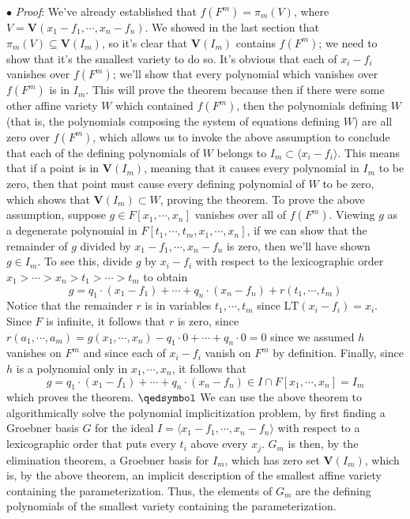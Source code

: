 \documentclass{article}
\begin{document}
\indent $ \bullet $ \textit{Proof}: We've already established that $ f(F^m) = \pi_m(V) $, where $ V = \mathbf{V}(x_1 - f_1, \cdots, x_n - f_n) $. We showed in the last section that $ \pi_m(V) \subseteq \mathbf{V}(I_m) $, so it's clear that $ \mathbf{V}(I_m) $ contains $ f(F^m) $; we need to show that it's the smallest variety to do so. It's obvious that each of $ x_i - f_i $ vanishes over $ f(F^m) $; we'll show that every polynomial which vanishes over $ f(F^m) $ is in $ I_m $. This will prove the theorem because then if there were some other affine variety $ W $ which contained $ f(F^m) $, then the polynomials defining $ W $ (that is, the polynomials composing the system of equations defining $ W $) are all zero over $ f(F^m) $, which allows us to invoke the above assumption to conclude that each of the defining polynomials of $ W $ belongs to $ I_m \subset \langle x_i - f_i \rangle $. This means that if a point is in $ \mathbf{V}(I_m) $, meaning that it causes every polynomial in $ I_m $ to be zero, then that point must cause every defining polynomial of $ W $ to be zero, which shows that $ \mathbf{V}(I_m) \subset W $, proving the theorem.
\newline
\indent To prove the above assumption, suppose $ g \in F[x_1, \cdots, x_n] $ vanishes over all of $ f(F^m) $. Viewing $ g $ as a degenerate polynomial in $ F[t_1, \cdots, t_m, x_1, \cdots, x_n] $, if we can show that the remainder of $ g $ divided by $ x_1 - f_1, \cdots, x_n - f_n $ is zero, then we'll have shown $ g \in I_m $. To see this, divide $ g $ by $ x_i - f_i $ with respect to the lexicographic order $ x_1 > \cdots > x_n > t_1 > \cdots > t_m $ to obtain
$$ g = q_1 \cdot (x_1 - f_1) + \cdots + q_n \cdot (x_n - f_n) + r(t_1, \cdots, t_m) $$
Notice that the remainder $ r $ is in variables $ t_1, \cdots, t_m $ since $ \text{LT}(x_i - f_i) = x_i $. Since $ F $ is infinite, it follows that $ r $ is zero, since $ r(a_1, \cdots, a_m) = g(x_1, \cdots, x_n) - q_1 \cdot 0 + \cdots + q_n \cdot 0 = 0 $ since we assumed $ h $ vanishes on $ F^m $ and since each of $ x_i - f_i $ vanish on $ F^m $ by definition. Finally, since $ h $ is a polynomial only in $ x_1, \cdots, x_n $, it follows that
$$ g = q_1 \cdot (x_1 - f_1) + \cdots + q_n \cdot (x_n - f_n) \in I \cap F[x_1, \cdots, x_n] = I_m $$
which proves the theorem. $ \qedsymbol $
\newline \newline
We can use the above theorem to algorithmically solve the polynomial implicitization problem, by first finding a Groebner basis $ G $ for the ideal $ I = \langle x_1 - f_1, \cdots, x_n - f_n \rangle $ with respect to a lexicographic order that puts every $ t_i $ above every $ x_j $. $ G_m $ is then, by the elimination theorem, a Groebner basis for $ I_m $, which has zero set $ \mathbf{V}(I_m) $, which is, by the above theorem, an implicit description of the smallest affine variety containing the parameterization. Thus, the elements of $ G_m $ are the defining polynomials of the smallest variety containing the parameterization.
\end{document}

